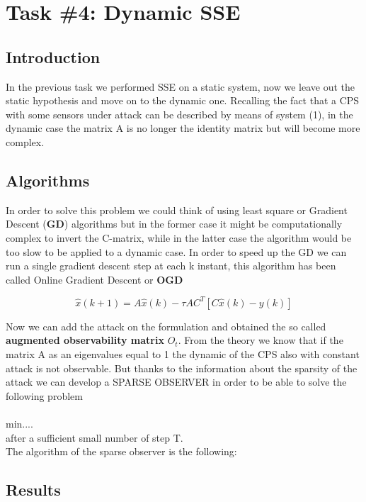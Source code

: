 \section*{Task \#4: Dynamic SSE}
    \subsection*{Introduction}
    In the previous task we performed SSE on a static system, now we leave out the static hypothesis and move on to the dynamic one.
    Recalling the fact that a CPS with some sensors under attack can be described by means of system (1), in the dynamic case the matrix A is no longer the identity matrix but will become more complex.
    \subsection*{Algorithms}
    In order to solve this problem we could think of using least square or Gradient Descent (\textbf{GD}) algorithms but in the former case it might be computationally complex to invert the C-matrix, while in the latter case the algorithm would be too slow to be applied to a dynamic case.
    In order to speed up the GD we can run a single gradient descent step at each k instant, this algorithm has been called Online Gradient Descent or \textbf{OGD} 

    $$\hat{x}(k+1) = A\hat{x}(k) - \tau AC^T[C\hat{x}(k) - y(k)]$$

    Now we can add the attack on the formulation and obtained the so called \textbf{augmented observability matrix} $O_t$. From the theory we know that if the matrix A as an eigenvalues equal to 1 the dynamic of the CPS also with constant attack is not observable.
    But thanks to the information about the sparsity of the attack we can develop a SPARSE OBSERVER in order to be able to solve the following problem \\
    \\min....
    \\after a sufficient small number of step T.
    \\The algorithm of the sparse observer is the following:
    
    
    \subsection*{Results}